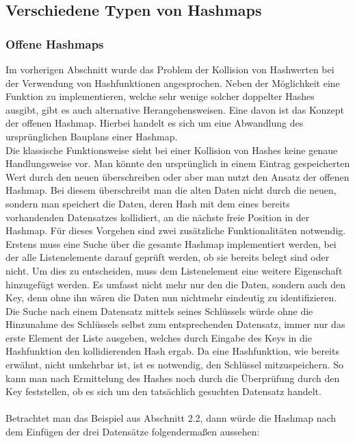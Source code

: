 \documentclass[11pt,a4paper]{article}
\begin{document}
\subsection{Verschiedene Typen von Hashmaps}
\subsubsection{Offene Hashmaps}
Im vorherigen Abschnitt wurde das Problem der Kollision von Hashwerten bei der Verwendung von Hashfunktionen angesprochen.
Neben der Möglichkeit eine Funktion zu implementieren, welche sehr wenige solcher doppelter Hashes ausgibt, gibt es auch alternative Herangehensweisen.
Eine davon ist das Konzept der offenen Hashmap. Hierbei handelt es sich um eine Abwandlung des ursprünglichen Bauplans einer Hashmap.\\
Die klassische Funktionsweise sieht bei einer Kollision von Hashes keine genaue Handlungsweise vor. Man könnte den ursprünglich in einem Eintrag 
gespeicherten Wert durch den neuen überschreiben oder aber man nutzt den Ansatz der offenen Hashmap.
Bei diesem überschreibt man die alten Daten nicht durch die neuen, sondern man speichert die Daten, deren Hash mit dem eines bereits vorhandenden Datensatzes 
kollidiert, an die nächste freie Position in der Hashmap.
Für dieses Vorgehen sind zwei zusätzliche Funktionalitäten notwendig.\\
Erstens muss eine Suche über die gesamte Hashmap implementiert werden, bei der alle Listenelemente darauf geprüft werden, ob sie bereits belegt sind oder nicht.
Um dies zu entscheiden, muss dem Listenelement eine weitere Eigenschaft hinzugefügt werden. Es umfasst nicht mehr nur den die Daten, sondern auch den Key, denn ohne
ihn wären die Daten nun nichtmehr eindeutig zu identifizieren.
Die Suche nach einem Datensatz mittels seines Schlüssels würde ohne die Hinzunahme des Schlüssels selbst zum entsprechenden Datensatz, immer nur das erste Element der Liste 
ausgeben, welches durch Eingabe des Keys in die Hashfunktion den kollidierenden Hash ergab. Da eine Hashfunktion, wie bereits erwähnt, nicht umkehrbar ist, ist es notwendig,
den Schlüssel mitzuspeichern. So kann man nach Ermittelung des Hashes noch durch die Überprüfung durch den Key feststellen, ob es sich um den tatsächlich gesuchten Datensatz handelt.\\\\
Betrachtet man das Beispiel aus Abschnitt 2.2, dann würde die Hashmap nach dem Einfügen der drei Datensätze folgendermaßen aussehen:\\
\end{document}
